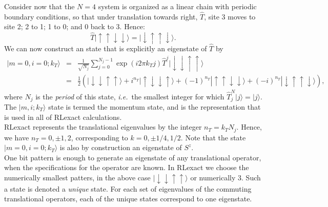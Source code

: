 \documentclass{article}
\begin{document}
Consider now that the $N=4$ system is organized as a linear chain with periodic boundary conditions, so that under translation  towards right, $\hat{T}$, site 3 moves to site 2; 2 to 1; 1 to 0; and 0 back to 3. Hence:
\begin{equation}
\hat{T} |\uparrow \uparrow \downarrow \downarrow \rangle = | \downarrow \uparrow \uparrow \downarrow \rangle .
\end{equation}
We can now construct an state that is explicitly an eigenstate of $\hat{T}$ by
\begin{eqnarray}
| m=0, i=0; k_T \rangle
  &=& \frac{1}{\sqrt{N_j}} \sum_{j=0}^{N_j-1} \exp (i 2 \pi k_T j) \hat{T}^j |\downarrow \downarrow \uparrow \uparrow \rangle \nonumber \\
 & =& \frac{1}{2}\left( |\downarrow \downarrow \uparrow \uparrow  \rangle 
 + i^{n_T} |\uparrow \downarrow \downarrow \uparrow  \rangle 
 + (-1)^{n_T} |\uparrow \uparrow \downarrow \downarrow  \rangle 
 + (-i)^{n_T} |\downarrow \uparrow \uparrow \downarrow  \rangle 
  \right) ,
\end{eqnarray}
where $N_j$ is the {\em period} of this state, {\em i.e.}\ the smallest integer for which $\hat{T}^N_j |j\rangle = |j\rangle$. The $| m, i; k_T \rangle$ state is termed the momentum state, and is the representation that is used in all of RLexact calculations. \\

RLexact represents the translational eigenvalues by the integer $n_T = k_T N_j$. Hence, we have $n_T = 0, \pm 1, 2$, corresponding to $k= 0, \pm 1/4, 1/2$. Note that the state $| m=0, i=0; k_T \rangle$ is also by construction an eigenstate of $S^z$.\\

One bit pattern is enough to generate an eigenstate of any translational operator, when the specifications for the operator are known. In RLexact we choose the numerically  smallest patters, in the above case $ |\downarrow \downarrow \uparrow \uparrow \rangle $ or numerically 3. Such a state is denoted a {\em unique} state. For each set of eigenvalues of the commuting translational operators, each of the unique states correspond to one eigenstate. \\
\end{document}
